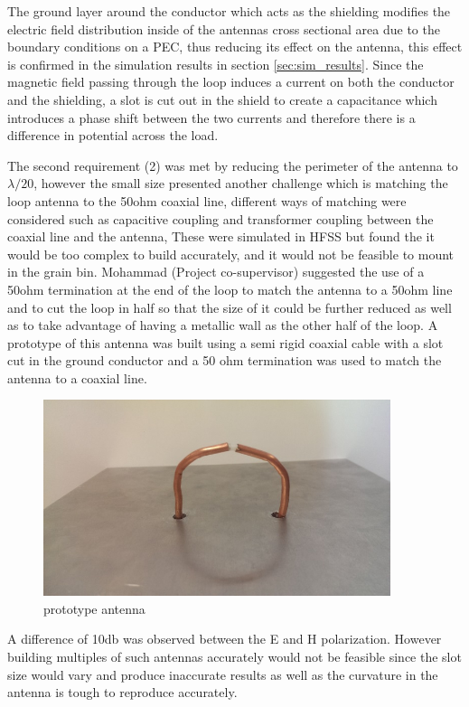 The ground layer around the conductor which acts as the shielding modifies the electric field distribution inside of the antennas cross sectional area due to the boundary conditions on a PEC, thus reducing its effect on the antenna, this effect is confirmed in the simulation results in section \ref{sec:sim_results}. Since the magnetic field passing through the loop induces a current on both the conductor and the shielding, a slot is cut out in the shield to create a capacitance which introduces a phase shift between the two currents and therefore there is a difference in potential across the load.

The second requirement (2) was met by reducing the perimeter of the antenna to $\lambda /20$, however the small size presented another challenge which is matching the loop antenna to the 50ohm coaxial line, different ways of matching were considered such as capacitive coupling and transformer coupling between the coaxial line and the antenna, These were simulated in HFSS but found the it would be too complex to build accurately, and it would not be feasible to mount in the grain bin. Mohammad (Project co-supervisor) suggested the use of a 50ohm termination at the end of the loop to match the antenna to a 50ohm line and to cut the loop in half so that the size of it could be further reduced as well as to take advantage of having a metallic wall as the other half of the loop. A prototype of this antenna was built using a semi rigid coaxial cable with a slot cut in the ground conductor and a 50 ohm termination was used to match the antenna to a coaxial line.

\begin{figure}[h]
	\begin{center}
		\includegraphics[width=4in]{./images/Figure2.jpg}
		\caption{prototype antenna}
		\label{fig:hfield_fig2}
	\end{center}
\end{figure}

A difference of 10db was observed between the E and H polarization. However building multiples of such antennas accurately would not be feasible since the slot size would vary and produce inaccurate results as well as the curvature in the antenna is tough to reproduce accurately.

